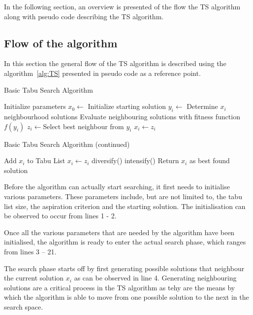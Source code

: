 In the following section, an overview is presented of the flow the TS algorithm along with pseudo code describing the TS algorithm.
\subsection{Flow of the algorithm}
In this section the general flow of the TS algorithm is described using the algorithm~\ref{alg:TS} presented in pseudo code as a reference point.
\begin{algorithm}[H]
\caption{Basic Tabu Search Algorithm\cite{TabuRCAProblem,TabuMontemanniSmith}}
\label{alg:TS}
	\begin{algorithmic}[1]
		\State Initialize parameters
		\State $x_0 \leftarrow$ Initialize starting solution
			\State $y_i \leftarrow$ Determine $x_i$ neighbourhood solutions 
			\State Evaluate neighbouring solutions with fitness function $f(y_i)$
			\State $z_i \leftarrow$Select best neighbour from $y_i$
					\State $x_i \leftarrow z_i$
				\EndIf
	\end{algorithmic}
\end{algorithm}

\begin{algorithm}[H]
\caption{Basic Tabu Search Algorithm (continued) \cite{TabuRCAProblem,TabuMontemanniSmith}}
\label{alg:TS2}
	\begin{algorithmic}[1]
			\Else
				\State Add $x_i$ to Tabu List
				\State $x_i \leftarrow z_i$
					\State diversify()
				\Else
					\State intensify()
				\EndIf
			\EndIf
		\EndWhile
		\State Return $x_i$ as best found solution
	\end{algorithmic}
\end{algorithm}

Before the algorithm can actually start searching, it first needs to initialise various parameters. These parameters include, but are not limited to, the tabu list size, the aspiration criterion and the starting solution. The initialisation can be observed to occur from lines 1 - 2.

Once all the various parameters that are needed by the algorithm have been initialised, the algorithm is ready to enter the actual search phase, which ranges from lines 3 -- 21. 

The search phase starts off by first generating possible solutions that neighbour the current solution $x_i$ as can be observed in line 4. Generating neighbouring solutions are a critical process in the TS algorithm as tehy are the means by which the algorithm is able to move from one possible solution to the next in the search space.

